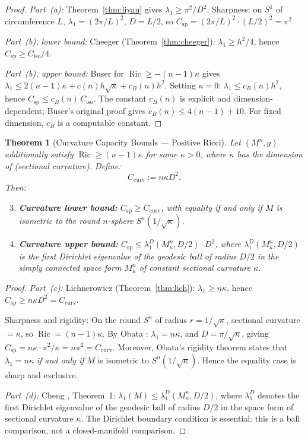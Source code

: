 \documentclass[11pt]{article}
\newtheorem{theorem}{Theorem}[section]
\theoremstyle{definition}
\theoremstyle{remark}
\newcommand{\Ric}{\operatorname{Ric}}
\newcommand{\Csp}{C_{\mathrm{sp}}}
\begin{document}
\begin{proof}
\emph{Part~(a):} Theorem~\ref{thm:liyau} gives $\lambda_1 \ge \pi^2/D^2$. Sharpness: on $S^1$ of circumference $L$, $\lambda_1 = (2\pi/L)^2$, $D = L/2$, so $\Csp = (2\pi/L)^2 \cdot (L/2)^2 = \pi^2$.

\emph{Part~(b), lower bound:} Cheeger (Theorem~\ref{thm:cheeger}): $\lambda_1 \ge h^2/4$, hence $\Csp \ge C_{\mathrm{iso}}/4$.

\emph{Part~(b), upper bound:} Buser \cite{Buser} for $\Ric \ge -(n-1)\kappa$ gives $\lambda_1 \le 2(n-1)\kappa + c(n)h\sqrt{\kappa} + c_B(n)h^2$. Setting $\kappa = 0$: $\lambda_1 \le c_B(n)h^2$, hence $\Csp \le c_B(n)\,C_{\mathrm{iso}}$. The constant $c_B(n)$ is explicit and dimension-dependent; Buser's original proof gives $c_B(n) \le 4(n-1) + 10$. For fixed dimension, $c_B$ is a computable constant.
\end{proof}

\begin{theorem}[Curvature Capacity Bounds --- Positive Ricci]\label{thm:SCE_curv}
Let $(M^n, g)$ additionally satisfy $\Ric \ge (n-1)\kappa$ for some $\kappa > 0$, where $\kappa$ has the dimension of (sectional curvature). Define:
\[
C_{\mathrm{curv}} := n\kappa D^2. \tag{curvature capacity}
\]
Then:
\begin{enumerate}[nosep, label=(\alph*)]
\setcounter{enumi}{2}
\item \textbf{Curvature lower bound:} $\Csp \ge C_{\mathrm{curv}}$, with equality if and only if $M$ is isometric to the round $n$-sphere $S^n(1/\sqrt{\kappa})$.
\item \textbf{Curvature upper bound:} $\Csp \le \lambda_1^D(M^n_\kappa, D/2)\cdot D^2$, where $\lambda_1^D(M^n_\kappa, D/2)$ is the first Dirichlet eigenvalue of the geodesic ball of radius $D/2$ in the simply connected space form $M^n_\kappa$ of constant sectional curvature $\kappa$.
\end{enumerate}
\end{theorem}

\begin{proof}
\emph{Part~(c):} Lichnerowicz (Theorem~\ref{thm:lich}): $\lambda_1 \ge n\kappa$, hence $\Csp \ge n\kappa D^2 = C_{\mathrm{curv}}$.

Sharpness and rigidity: On the round $S^n$ of radius $r = 1/\sqrt{\kappa}$, sectional curvature $= \kappa$, so $\Ric = (n-1)\kappa$. By Obata \cite{Obata}: $\lambda_1 = n\kappa$, and $D = \pi/\sqrt{\kappa}$, giving $\Csp = n\kappa \cdot \pi^2/\kappa = n\pi^2 = C_{\mathrm{curv}}$. Moreover, Obata's rigidity theorem states that $\lambda_1 = n\kappa$ \emph{if and only if} $M$ is isometric to $S^n(1/\sqrt{\kappa})$. Hence the equality case is sharp and exclusive.

\emph{Part~(d):} Cheng \cite{Cheng}, Theorem~1: $\lambda_1(M) \le \lambda_1^D(M^n_\kappa, D/2)$, where $\lambda_1^D$ denotes the first Dirichlet eigenvalue of the geodesic ball of radius $D/2$ in the space form of sectional curvature $\kappa$. The Dirichlet boundary condition is essential: this is a ball comparison, not a closed-manifold comparison.
\end{proof}
\end{document}
